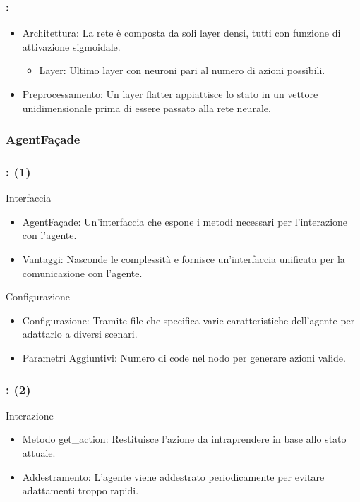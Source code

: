 \documentclass[compress]{beamer}
\begin{document}
\begin{frame}
    \frametitle{\subsecname: \subsubsecname}
    \begin{itemize}
        \item Architettura: La rete è composta da soli layer densi, tutti con funzione di attivazione sigmoidale.
        \begin{itemize}
            \item Layer: Ultimo layer con neuroni pari al numero di azioni possibili.
        \end{itemize}
        \item Preprocessamento: Un layer flatter appiattisce lo stato in un vettore unidimensionale prima di essere passato alla rete neurale.
    \end{itemize}
\end{frame}

\subsubsection{AgentFaçade}
\begin{frame}
    \frametitle{\subsecname: \subsubsecname (1)}
    Interfaccia
    \begin{itemize}
        \item AgentFaçade: Un'interfaccia che espone i metodi necessari per l'interazione con l'agente.
        \item Vantaggi: Nasconde le complessità e fornisce un'interfaccia unificata per la comunicazione con l'agente.
    \end{itemize}
    Configurazione
    \begin{itemize}
        \item Configurazione: Tramite file che specifica varie caratteristiche dell'agente per adattarlo a diversi scenari.
        \item Parametri Aggiuntivi: Numero di code nel nodo per generare azioni valide.
    \end{itemize}
\end{frame}

\begin{frame}
    \frametitle{\subsecname: \subsubsecname (2)}
    Interazione
    \begin{itemize}
        \item Metodo get\_action: Restituisce l'azione da intraprendere in base allo stato attuale.
        \item Addestramento: L'agente viene addestrato periodicamente per evitare adattamenti troppo rapidi.
    \end{itemize}
\end{frame}
\end{document}

